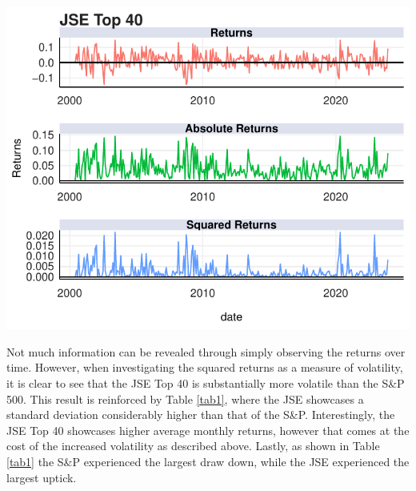 \documentclass[11pt,preprint, authoryear]{elsarticle}
\let\origfigure\figure
\let\endorigfigure\endfigure
\renewenvironment{figure}[1][2] {
    \expandafter\origfigure\expandafter[H]
} {
    \endorigfigure
}
\numberwithin{equation}{section}
\numberwithin{figure}{section}
\numberwithin{table}{section}
\begin{document}
\begin{figure}[H]

{\centering \includegraphics{FormalWriteUp_files/figure-latex/Figure2-1} 

}

\caption{JSE Top 40 Returns \label{Figure2}}\label{fig:Figure2}
\end{figure}

Not much information can be revealed through simply observing the
returns over time. However, when investigating the squared returns as a
measure of volatility, it is clear to see that the JSE Top 40 is
substantially more volatile than the S\&P 500. This result is reinforced
by Table \ref{tab1}, where the JSE showcases a standard deviation
considerably higher than that of the S\&P. Interestingly, the JSE Top 40
showcases higher average monthly returns, however that comes at the cost
of the increased volatility as described above. Lastly, as shown in
Table \ref{tab1} the S\&P experienced the largest draw down, while the
JSE experienced the largest uptick.
\end{document}
